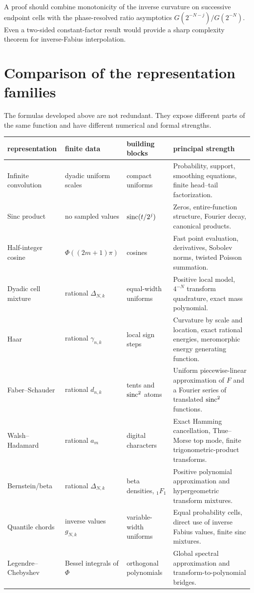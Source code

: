 \documentclass[11pt]{article}
\theoremstyle{definition}
\theoremstyle{remark}
\begin{document}
A proof should combine monotonicity of the inverse curvature on successive
endpoint cells with the phase-resolved ratio asymptotics
$G(2^{-N-j})/G(2^{-N})$.  Even a two-sided constant-factor result would provide
a sharp complexity theorem for inverse-Fabius interpolation.

\section{Comparison of the representation families}
\label{p3:sec:comparison}

The formulas developed above are not redundant.  They expose different parts
of the same function and have different numerical and formal strengths.

\begin{longtable}{@{}p{}p{}p{}p{}@{}}
\toprule
representation & finite data & building blocks & principal strength\\
\midrule
\endhead
Infinite convolution & dyadic uniform scales & compact uniforms & Probability,
support, smoothing equations, finite head--tail factorization.\\
Sinc product & no sampled values & $\operatorname{sinc}(t/2^j)$ & Zeros, entire-function
structure, Fourier decay, canonical products.\\
Half-integer cosine & $\Phi((2m+1)\pi)$ & cosines & Fast point evaluation,
derivatives, Sobolev norms, twisted Poisson summation.\\
Dyadic cell mixture & rational $\Delta_{N,k}$ & equal-width uniforms & Positive
local model, $4^{-N}$ transform quadrature, exact mass polynomial.\\
Haar & rational $\gamma_{n,k}$ & local sign steps & Curvature by scale and
location, exact rational energies, meromorphic energy generating function.\\
Faber--Schauder & rational $d_{n,k}$ & tents and $\operatorname{sinc}^2$ atoms & Uniform
piecewise-linear approximation of $F$ and a Fourier series of translated
$\operatorname{sinc}^2$ functions.\\
Walsh--Hadamard & rational $a_m$ & digital characters & Exact Hamming
cancellation, Thue--Morse top mode, finite trigonometric-product transforms.\\
Bernstein/beta & rational $\Delta_{N,k}$ & beta densities, ${}_1F_1$ & Positive
polynomial approximation and hypergeometric transform mixtures.\\
Quantile chords & inverse values $g_{N,k}$ & variable-width uniforms & Equal
probability cells, direct use of inverse Fabius values, finite sinc mixtures.\\
Legendre--Chebyshev & Bessel integrals of $\Phi$ & orthogonal polynomials &
Global spectral approximation and transform-to-polynomial bridges.\\
\bottomrule
\end{longtable}
\end{document}
